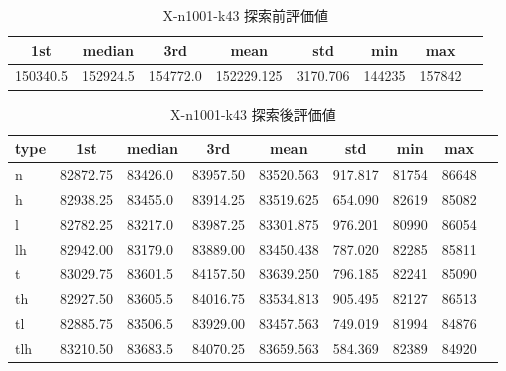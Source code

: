\begin{table}[htbp]
    \centering
    \caption{X-n1001-k43 探索前評価値}
    \begin{tabular}{|l|l|l|l|l|l|l|l|}\hline
    \multicolumn{1}{|c|}{\textbf{1st}}
    &\multicolumn{1}{c|}{\textbf{median}}
    &\multicolumn{1}{c|}{\textbf{3rd}}
    &\multicolumn{1}{c|}{\textbf{mean}}
    &\multicolumn{1}{c|}{\textbf{std}}
    &\multicolumn{1}{c|}{\textbf{min}}
    &\multicolumn{1}{c|}{\textbf{max}}\\\hline
	150340.5 & 152924.5 & 154772.0 & 152229.125 & 3170.706 & 144235 & 157842\\\hline
	\end{tabular}
\end{table}
\begin{table}[htbp]
    \centering
    \caption{X-n1001-k43 探索後評価値}
    \begin{tabular}{|l|l|l|l|l|l|l|l|l|}\hline
    \multicolumn{1}{|c|}{\textbf{type}}
    &\multicolumn{1}{|c|}{\textbf{1st}}
    &\multicolumn{1}{c|}{\textbf{median}}
    &\multicolumn{1}{c|}{\textbf{3rd}}
    &\multicolumn{1}{c|}{\textbf{mean}}
    &\multicolumn{1}{c|}{\textbf{std}}
    &\multicolumn{1}{c|}{\textbf{min}}
    &\multicolumn{1}{c|}{\textbf{max}}\\\hline
	n & 82872.75 & 83426.0 & 83957.50 & 83520.563 & 917.817 & 81754 & 86648\\\hline
	h & 82938.25 & 83455.0 & 83914.25 & 83519.625 & 654.090 & 82619 & 85082\\\hline
	l & 82782.25 & 83217.0 & 83987.25 & 83301.875 & 976.201 & 80990 & 86054\\\hline
	lh & 82942.00 & 83179.0 & 83889.00 & 83450.438 & 787.020 & 82285 & 85811\\\hline
	t & 83029.75 & 83601.5 & 84157.50 & 83639.250 & 796.185 & 82241 & 85090\\\hline
	th & 82927.50 & 83605.5 & 84016.75 & 83534.813 & 905.495 & 82127 & 86513\\\hline
	tl & 82885.75 & 83506.5 & 83929.00 & 83457.563 & 749.019 & 81994 & 84876\\\hline
	tlh & 83210.50 & 83683.5 & 84070.25 & 83659.563 & 584.369 & 82389 & 84920\\\hline
	\end{tabular}
\end{table}
